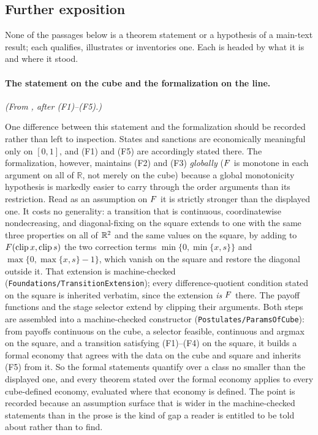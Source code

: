 \subsection{Further exposition}
\label{app:moved-ad}

None of the passages below is a theorem statement
or a hypothesis of a main-text result; each qualifies, illustrates or
inventories one. Each is headed by what it is and where it stood.

\paragraph{The statement on the cube and the formalization on the line.} \emph{(From , after \textup{(F1)--(F5)}.)}

One difference between this statement and the formalization should be
recorded rather than left to inspection. States and sanctions are
economically meaningful only on $[0,1]$, and \textup{(F1)} and
\textup{(F5)} are accordingly stated there. The formalization, however,
maintains \textup{(F2)} and \textup{(F3)} \emph{globally} ($F$ is
monotone in each argument on all of $\mathbb{R}$, not merely on the
cube) because a global monotonicity hypothesis is markedly easier to
carry through the order arguments than its restriction. Read as an
assumption on $F$ it is strictly stronger than the displayed one.
It costs no generality: a transition that is continuous, coordinatewise
nondecreasing, and diagonal-fixing on the square extends to one with the
same three properties on all of $\mathbb{R}^2$ and the same values on the
square, by adding to $F(\operatorname{clip}x,\operatorname{clip}s)$ the
two correction terms $\min\{0,\min\{x,s\}\}$ and
$\max\{0,\max\{x,s\}-1\}$, which vanish on the square and restore
the diagonal outside it. That extension is machine-checked
(\texttt{Foundations/TransitionExtension}); every difference-quotient condition stated
on the square is inherited verbatim, since the extension \emph{is}
$F$ there. The payoff functions and the stage selector extend by
clipping their arguments. Both steps are assembled into a machine-checked
constructor (\texttt{Postulates/ParamsOfCube}): from payoffs continuous on
the cube, a selector feasible, continuous and argmax on the square, and a
transition satisfying \textup{(F1)--(F4)} on the square, it builds a formal
economy that agrees with the data on the cube and square and inherits
\textup{(F5)} from it. So the formal statements quantify over a class no
smaller than the displayed one, and every theorem stated over the formal
economy applies to every cube-defined economy, evaluated where that economy
is defined.
The point is recorded because an assumption surface that is wider in
the machine-checked statements than in the prose is the kind of gap a
reader is entitled to be told about rather than to find.

